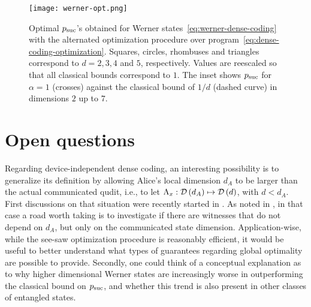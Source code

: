         
        \begin{figure}
            \centering
            \texttt{[image: werner-opt.png]}
            \caption{Optimal $p_{\text{suc}}$'s obtained for Werner states~\eqref{eq:werner-dense-coding} with the alternated optimization procedure over program~\eqref{eq:dense-coding-optimization}. Squares, circles, rhombuses and triangles correspond to $d = 2, 3, 4$ and $5$, respectively. Values are reescaled so that all classical bounds correspond to $1$. The inset shows $p_{\text{suc}}$ for $\alpha = 1$ (crosses) against the classical bound of $1/d$ (dashed curve) in dimensions $2$ up to $7$.}
        \label{fig:werner-dense-coding-psuc}
        \end{figure}

    
    \section{Open questions}

    Regarding device-independent dense coding, an interesting possibility is to generalize its definition by allowing Alice's local dimension $d_A$ to be larger than the actual communicated qudit, i.e., to let $\Lambda_x : \mathcal{D}\left( d_A \right) \mapsto \mathcal{D}\left( d \right)$, with $d < d_A$. First discussions on that situation were recently started in \cite{nayak_rigidity_2020,tavakoli_eapam_2021}. As noted in \cite{tavakoli_eapam_2021}, in that case a road worth taking is to investigate if there are witnesses that do not depend on $d_A$, but only on the communicated state dimension. Application-wise, while the see-saw optimization procedure is reasonably efficient, it would be useful to better understand what types of guarantees regarding global optimality are possible to provide. Secondly, one could think of a conceptual explanation as to why higher dimensional Werner states are increasingly worse in outperforming the classical bound on $p_{\text{suc}}$, and whether this trend is also present in other classes of entangled states.

